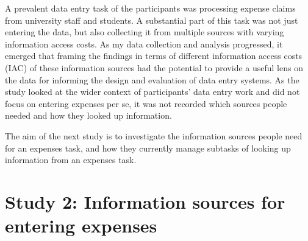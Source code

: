 \documentclass[11pt,oneside]{report}
\begin{document}
A prevalent data entry task of the participants was processing expense claims from university staff and students. A substantial part of this task was not just entering the data, but also collecting it from multiple sources with varying information access costs. As my data collection and analysis progressed, it emerged that framing the findings in terms of different information access costs (IAC) of these information sources had the potential to provide a useful lens on the data for informing the design and evaluation of data entry systems. As the study looked at the wider context of participants' data entry work and did not focus on entering expenses per se, it was not recorded which sources people needed and how they looked up information.

The aim of the next study is to investigate the information sources people need for an expenses task, and how they currently manage subtasks of looking up information from an expenses task. 

\section{Study 2: Information sources for entering expenses}
\end{document}
